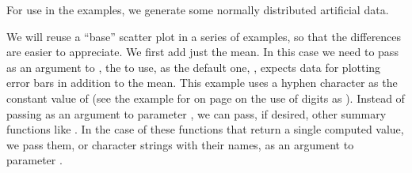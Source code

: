 \documentclass[krantz2]{krantz}\usepackage{knitr}
\begin{document}
For use in the examples, we generate some normally distributed artificial data.

\begin{knitrout}\footnotesize
{}\color{fgcolor}\begin{kframe}
\begin{alltt}
 \hlkwb{<-} \hlstd{(}
   \hlstd{=} \hlstd{(}\hlstd{(}\hlstd{,}  \hlstd{=} \hlstd{,}  \hlstd{=} \hlstd{),}
        \hlstd{(}\hlstd{,}  \hlstd{=} \hlstd{,}  \hlstd{=} \hlstd{)),}
   \hlstd{=} \hlstd{(}\hlstd{(}\hlstd{(}\hlstd{,} \hlstd{),} \hlstd{(}\hlstd{,} \hlstd{)))}
  \hlstd{)}
\end{alltt}
\end{kframe}
\end{knitrout}

We will reuse a ``base'' scatter plot in a series of examples, so that the differences are easier to appreciate. We first add just the mean. In this case we need to pass as an argument to , the  to use, as the default one, , expects data for plotting error bars in addition to the mean. This example uses a hyphen character as the constant value of  (see the example for  on page \pageref{chunk:plot:point:char} on the use of digits as ). Instead of passing  as an argument to parameter , we can pass, if desired, other summary functions like . In the case of these functions that return a single computed value, we pass them, or character strings with their names, as an argument to parameter .
\end{document}
